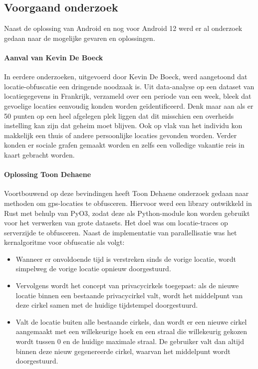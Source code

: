 \subsection{Voorgaand onderzoek}
Naast de oplossing van Android en nog voor Android 12 werd er al onderzoek gedaan naar de mogelijke gevaren en oplossingen.
\paragraph{Aanval van Kevin De Boeck} \cite{kevin}
In eerdere onderzoeken, uitgevoerd door Kevin De Boeck, werd aangetoond dat locatie-obfuscatie een dringende noodzaak is. Uit data-analyse op een dataset van locatiegegevens in Frankrijk, verzameld over een periode van een week, bleek dat gevoelige locaties eenvoudig konden worden geïdentificeerd. Denk maar aan als er 50 punten op een heel afgelegen plek liggen dat dit misschien een overheids instelling kan zijn dat geheim moet blijven.
Ook op vlak van het individu kon makkelijk een thuis of andere persoonlijke locaties gevonden worden. Verder konden er sociale grafen gemaakt worden en zelfs een volledige vakantie reis in kaart gebracht worden.

\paragraph{Oplossing Toon Dehaene} \cite{DehaeneToon2023MLSi}
Voortbouwend op deze bevindingen heeft Toon Dehaene onderzoek gedaan naar methoden om \gls{gps}-locaties te obfusceren.
Hiervoor werd een library ontwikkeld in Rust met behulp van PyO3, zodat deze als Python-module kon worden gebruikt voor het verwerken van grote datasets. Het doel was om locatie-traces op serverzijde te obfusceren. Naast de implementatie van parallellisatie was het kernalgoritme voor obfuscatie als volgt:
\begin{itemize}
    \item Wanneer er onvoldoende tijd is verstreken sinds de vorige locatie, wordt simpelweg de vorige locatie opnieuw doorgestuurd.
    \item Vervolgens wordt het concept van privacycirkels toegepast: als de nieuwe locatie binnen een bestaande privacycirkel valt, wordt het middelpunt van deze cirkel samen met de huidige tijdstempel doorgestuurd. 
    \item Valt de locatie buiten alle bestaande cirkels, dan wordt er een nieuwe cirkel aangemaakt met een willekeurige hoek en een straal die willekeurig gekozen wordt tussen 0 en de huidige maximale straal. De gebruiker valt dan altijd binnen deze nieuw gegenereerde cirkel, waarvan het middelpunt wordt doorgestuurd.
\end{itemize}

